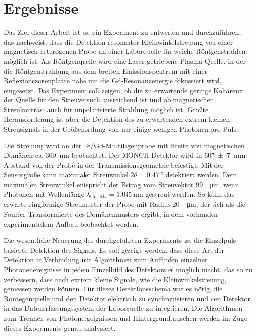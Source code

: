\chapter{Ergebnisse}
\label{text:auswertung}
Das Ziel dieser Arbeit ist es, ein Experiment zu entwerfen und durchzuführen, das nachweist, dass die Detektion resonanter Kleinwinkelstreuung von einer magnetisch heterogenen Probe an einer Laborquelle für weiche Röntgenstrahlen möglich ist. Als Röntgenquelle wird eine Laser-getriebene Plasma-Quelle, in der die Röntgenstrahlung aus dem breiten Emissionspektrum mit einer Reflexionszonenplatte nähe um die Gd-Resonanzenergie fokussiert wird, eingesetzt. Das Experiment soll zeigen, ob die zu erwartende geringe Kohärenz der Quelle für den Streuversuch ausreichend ist und ob magnetischer Streukontrast auch für unpolarisierte Strahlung möglich ist. Größte Herausforderung ist aber die Detektion des zu erwartenden extrem kleinen Streusignals in der Größenordung von nur einige wenigen Photonen pro Puls.

\noindent
Die Streuung wird an der Fe/Gd-Multilagenprobe mit Breite von magnetischen Domänen ca. \SI{300}{\nano\meter} beobachtet. Der MÖNCH-Detektor wird in \SI{607(7)}{\milli\meter} Abstand von der Probe in der Transmissionsgeometrie befestigt. Mit der  Sensorgröße kann maximaler Streuwinkel $2\theta = \SI{0.47}{\degree}$ detektiert werden. Dem maximalen Streuwinkel entspricht der Betrag vom Streuvektor \SI{99}{\per\micro\meter}, wenn Photonen mit Wellenlänge $\lambda_\text{Gd, M5} = \SI{1.045}{\nano\meter}$ gestreut werden. So kann das erwarte ringförmige Streumuster der Probe mit Radius \SI{20}{\per\micro\meter}, der sich als die Fourier-Transformierte des Domänenmusters ergibt, in dem vorhanden experimentellem Aufbau beobachtet werden.

\noindent
Die wesentliche Neuerung des durchgeführten Experiments ist die Einzelpuls-basierte Detektion des Signals. Es soll gezeigt werden, dass diese Art der Detektion in Verbindung mit Algorithmen zum Auffinden einzelner Photonenereignisse in jedem Einzelbild des Detektors es möglich macht, das  so zu verbessern, dass auch extrem kleine Signale, wie die Kleinwinkelstreuung, gemessen werden können. Für dieses Detektionsschema war es nötig, die Röntegenquelle und den Detektor elektrisch zu synchronisieren und den Detektor in das Datenerfassungssystem der Laborquelle zu integrieren. Die Algorithmen zum Trennen von Photonergeignissen und Hintergrundrauschen werden im Zuge dieses Experiments genau analysiert.

